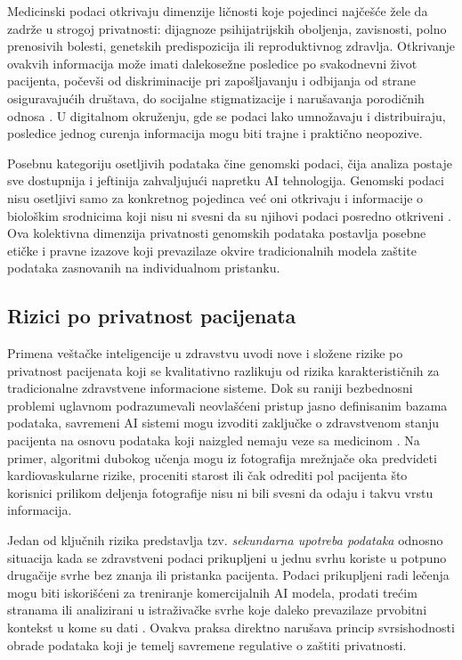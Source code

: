 \documentclass[12pt]{article}
\begin{document}
Medicinski podaci otkrivaju dimenzije ličnosti koje pojedinci najčešće žele da zadrže u strogoj privatnosti: dijagnoze psihijatrijskih oboljenja, zavisnosti, polno prenosivih bolesti, genetskih predispozicija ili reproduktivnog zdravlja. Otkrivanje ovakvih informacija može imati dalekosežne posledice po svakodnevni život pacijenta, počevši od 
diskriminacije pri zapošljavanju i odbijanja od strane osiguravajućih društava, do socijalne stigmatizacije i narušavanja porodičnih odnosa \cite{abouelmehdi2017}. U digitalnom okruženju, gde se podaci lako umnožavaju i distribuiraju, posledice jednog curenja informacija mogu biti trajne i praktično neopozive.
 
Posebnu kategoriju osetljivih podataka čine genomski podaci, čija analiza postaje sve dostupnija i jeftinija zahvaljujući napretku AI tehnologija. Genomski podaci nisu osetljivi samo za konkretnog pojedinca već oni otkrivaju i informacije o biološkim srodnicima koji nisu ni svesni da su njihovi podaci posredno otkriveni \cite{murdoch2021}. Ova kolektivna dimenzija privatnosti genomskih podataka postavlja posebne etičke i 
pravne izazove koji prevazilaze okvire tradicionalnih modela zaštite podataka zasnovanih na individualnom pristanku.
 
 
\subsection{Rizici po privatnost pacijenata}
Primena veštačke inteligencije u zdravstvu uvodi nove i složene rizike po privatnost pacijenata koji se kvalitativno razlikuju od rizika karakterističnih za tradicionalne zdravstvene informacione sisteme. Dok su raniji bezbednosni problemi uglavnom podrazumevali neovlašćeni pristup jasno definisanim bazama podataka, savremeni AI sistemi mogu izvoditi zaključke o zdravstvenom stanju pacijenta na osnovu podataka koji 
naizgled nemaju veze sa medicinom \cite{topol2019}. Na primer, algoritmi dubokog učenja mogu iz fotografija mrežnjače oka predvideti kardiovaskularne rizike, proceniti starost ili čak odrediti pol pacijenta što korisnici prilikom deljenja fotografije nisu ni bili svesni da odaju i takvu vrstu informacija.
 
Jedan od ključnih rizika predstavlja tzv. \textit{sekundarna upotreba podataka} odnosno situacija kada se zdravstveni podaci prikupljeni u jednu svrhu koriste u potpuno drugačije svrhe bez znanja ili pristanka pacijenta. Podaci prikupljeni radi lečenja mogu biti iskorišćeni za treniranje komercijalnih AI modela, prodati trećim stranama ili analizirani u istraživačke svrhe koje daleko prevazilaze prvobitni kontekst u kome su 
dati \cite{kumar2025}. Ovakva praksa direktno narušava princip svrsishodnosti obrade podataka koji je temelj savremene regulative o zaštiti privatnosti.
 
\end{document}
